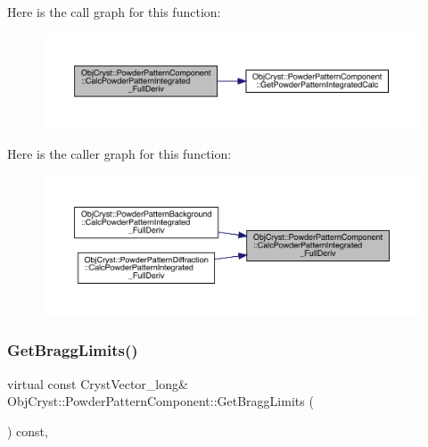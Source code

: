 Here is the call graph for this function\+:
\nopagebreak
\begin{figure}[H]
\begin{center}
\leavevmode
\includegraphics[width=350pt]{class_obj_cryst_1_1_powder_pattern_component_a7825422fec4a6ee5f1a00bc4063104ef_cgraph}
\end{center}
\end{figure}
Here is the caller graph for this function\+:
\nopagebreak
\begin{figure}[H]
\begin{center}
\leavevmode
\includegraphics[width=350pt]{class_obj_cryst_1_1_powder_pattern_component_a7825422fec4a6ee5f1a00bc4063104ef_icgraph}
\end{center}
\end{figure}
\mbox{\label{class_obj_cryst_1_1_powder_pattern_component_a727488f859528b0a9b5da47973804e01}} 
\subsubsection{\texorpdfstring{GetBraggLimits()}{GetBraggLimits()}}
{\footnotesize\ttfamily virtual const Cryst\+Vector\+\_\+long\& Obj\+Cryst\+::\+Powder\+Pattern\+Component\+::\+Get\+Bragg\+Limits (\begin{DoxyParamCaption}{ }\end{DoxyParamCaption}) const\hspace{0.3cm}{\ttfamily [protected]}, {}}

